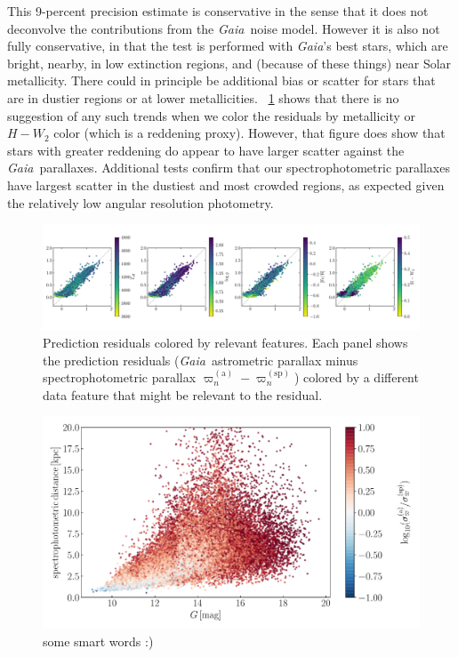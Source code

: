 \documentclass[modern]{aastex62}
\newcommand{\project}[1]{\textsl{#1}}
\newcommand{\gaia}{\project{Gaia}}
\newcommand{\gparallax}{\varpi^{(\mathrm{a})}}
\newcommand{\sparallax}{\varpi^{(\mathrm{sp})}}
\begin{document}
This 9-percent precision estimate is conservative in the sense that it does not deconvolve
the contributions from the \gaia\ noise model.
However it is also not fully conservative, in that the test is performed with
\gaia's best stars, which are bright, nearby, in low extinction regions, and
(because of these things) near Solar metallicity.
There could in principle be additional bias or scatter for stars that are in dustier
regions or at lower metallicities.
\figurename~\ref{fig:residuals} shows that
there is no suggestion of any such trends when we color the residuals by metallicity
or $H-W_2$ color (which is a reddening proxy).
However, that figure does show that stars with greater reddening do appear to have
larger scatter against the \gaia\ parallaxes.
Additional tests confirm that our spectrophotometric parallaxes have largest scatter
in the dustiest and most crowded regions, as expected given the relatively low angular resolution
photometry.
\begin{figure}
\includegraphics[width=\textwidth]{./residuals_training.pdf}
\caption{Prediction residuals colored by relevant features.
  Each panel shows the prediction residuals (\gaia\ astrometric parallax minus
  spectrophotometric parallax $\gparallax_n-\sparallax_n$) colored by a different
  data feature that might be relevant to the residual.\label{fig:residuals}}
\end{figure}

\begin{figure}
\centering
\includegraphics[width=\textwidth]{./precision.pdf}
\caption{some smart words :) \label{fig:precision}}
\end{figure}
\end{document}

